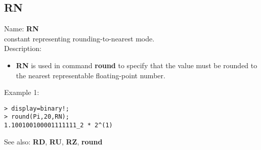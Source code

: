 \subsection{ RN }
\noindent Name: \textbf{RN}\\
constant representing rounding-to-nearest mode.\\

\noindent Description: \begin{itemize}

\item \textbf{RN} is used in command \textbf{round} to specify that the value must be rounded
   to the nearest representable floating-point number.
\end{itemize}
\noindent Example 1: 
\begin{center}\begin{minipage}{15cm}\begin{Verbatim}[frame=single]
> display=binary!;
> round(Pi,20,RN);
1.100100100001111111_2 * 2^(1)
\end{Verbatim}
\end{minipage}\end{center}
See also: \textbf{RD}, \textbf{RU}, \textbf{RZ}, \textbf{round}
